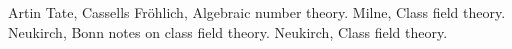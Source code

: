 %








\begin{thebibliography}{50}
	Artin Tate,
	Cassells Fr\"ohlich,
	Algebraic number theory.
  Milne,
  Class field theory.
	Neukirch,
	Bonn notes on class field theory.
  Neukirch,
  Class field theory.

\end{thebibliography}
